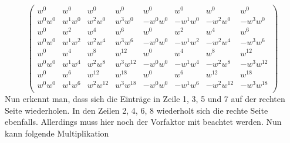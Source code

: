 \begin{equation*}
\left( \begin{array}{cccccccc}
w^{0} & w^{0} & w^{0} & w^{0} & w^{0} & w^{0} & w^{0} & w^{0}\\
w^{0}w^{0} & w^{1}w^{0} & w^{2}w^{0} & w^{3}w^{0} & -w^{0}w^{0} & -w^{1}w^{0} & -w^{2}w^{0} & -w^{3}w^{0}\\
w^{0} & w^{2} & w^{4} & w^{6} & w^{0} & w^{2} & w^{4} & w^{6}\\
w^{0}w^{0} & w^{1}w^{2} & w^{2}w^{4} & w^{3}w^{6} & -w^{0}w^{0} & -w^{1}w^{2} & -w^{2}w^{4} & -w^{3}w^{6}\\
w^{0} & w^{4} & w^{8} & w^{12} & w^{0} & w^{4} & w^{8} & w^{12}\\
w^{0}w^{0} & w^{1}w^{4} & w^{2}w^{8} & w^{3}w^{12} & -w^{0}w^{0} & -w^{1}w^{4} & -w^{2}w^{8} & -w^{3}w^{12}\\
w^{0} & w^{6} & w^{12} & w^{18} & w^{0} & w^{6} & w^{12} & w^{18}\\
w^{0}w^{0} & w^{1}w^{6} & w^{2}w^{12} & w^{3}w^{18} & -w^{0}w^{0} & -w^{1}w^{6} & -w^{2}w^{12} & -w^{3}w^{18}\\
\end{array} \right)
\end{equation*} 
Nun erkennt man, dass sich die Einträge in Zeile 1, 3, 5 und 7 auf der rechten Seite wiederholen. In den Zeilen 2, 4, 6, 8 wiederholt sich die rechte Seite ebenfalls. Allerdings muss hier noch der Vorfaktor mit beachtet werden.
Nun kann folgende Multiplikation 
